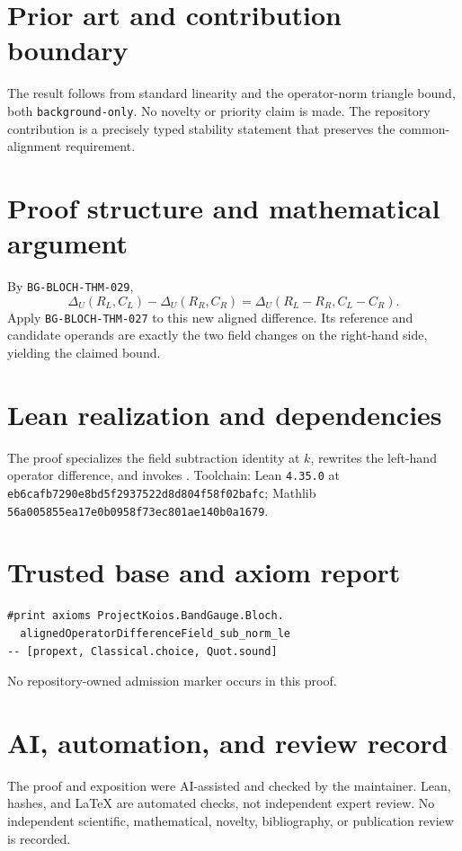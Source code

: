 \documentclass[11pt]{article}
\begin{document}
\section{Prior art and contribution boundary}
The result follows from standard linearity and the operator-norm triangle bound, both \texttt{background-only}.  No novelty or priority claim is made.  The repository contribution is a precisely typed stability statement that preserves the common-alignment requirement.

\section{Proof structure and mathematical argument}
By \texttt{BG-BLOCH-THM-029},
\[
 \Delta_U(R_L,C_L)-\Delta_U(R_R,C_R)
 =\Delta_U(R_L-R_R,C_L-C_R).
\]
Apply \texttt{BG-BLOCH-THM-027} to this new aligned difference.  Its reference and candidate operands are exactly the two field changes on the right-hand side, yielding the claimed bound.

\section{Lean realization and dependencies}
The proof specializes the field subtraction identity at $k$, rewrites the left-hand operator difference, and invokes .  Toolchain: Lean \texttt{4.35.0} at \texttt{eb6cafb7290e8bd5f2937522d8d804f58f02bafc}; Mathlib \texttt{56a005855ea17e0b0958f73ec801ae140b0a1679}.

\section{Trusted base and axiom report}
\begin{verbatim}
#print axioms ProjectKoios.BandGauge.Bloch.
  alignedOperatorDifferenceField_sub_norm_le
-- [propext, Classical.choice, Quot.sound]
\end{verbatim}
No repository-owned admission marker occurs in this proof.

\section{AI, automation, and review record}
The proof and exposition were AI-assisted and checked by the maintainer.  Lean, hashes, and LaTeX are automated checks, not independent expert review.  No independent scientific, mathematical, novelty, bibliography, or publication review is recorded.
\end{document}
